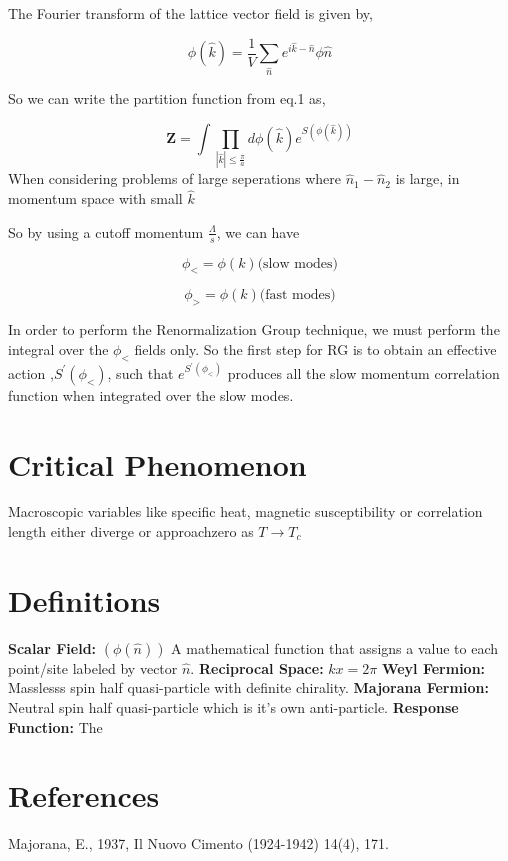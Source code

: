 \documentclass{article}
\begin{document}
The Fourier transform of the lattice vector field is given by,

\begin{equation}
  \phi(\hat{k}) = \frac{1}{V} \sum_{\hat{n}}e^{i\hat{k} - \hat{n}} \phi{\hat{n}}
\end{equation}

So we can write the partition function from eq.1 as,

\begin{equation}
  \mathbf{Z} = \int \prod_{|\hat {k}| \leq \frac{\pi}{a}} d\phi(\hat{k})e^{S(\phi(\hat{k}))}
\end{equation}
When considering problems of large seperations where $ \hat{n}_1 - \hat{n}_2$ is large,
in momentum space with small $\hat{k}$

So by using a cutoff momentum $ \frac{\Lambda}{s}$, we can have

\begin{equation}
  \phi_{<} =  \phi(k) \text{(slow modes)}
\end{equation}

\begin{equation}
  \phi_{>} =  \phi(k) \text{(fast modes)}
\end{equation}

In order to perform the Renormalization Group technique, we must perform the integral
over the $\phi_{<} $ fields only. So the first step for RG is to obtain an effective action
,$S^{'}(\phi _{<}) $, such that $e^{S^{'}(\phi _{<}) } $ produces all the slow momentum
correlation function when integrated over the slow modes.

\section{Critical Phenomenon}
Macroscopic variables like specific heat, magnetic
susceptibility or correlation length either diverge or
approachzero as $T \rightarrow T_c $
\section{Definitions}

\textbf{Scalar Field:} $(\phi(\hat{n}))$ A mathematical function that assigns
a value to each point/site labeled by vector $\hat{n} $. \newline
\textbf{Reciprocal Space:} $kx = 2\pi $ \newline
\textbf{Weyl Fermion:} Masslesss spin half quasi-particle with definite chirality. \newline
\textbf{Majorana Fermion:} Neutral spin half quasi-particle which is it's own anti-particle. \newline
\textbf{Response Function:} The\newline
\section{References}
Majorana, E., 1937, Il Nuovo Cimento (1924-1942) 14(4), 171.
\end{document}

